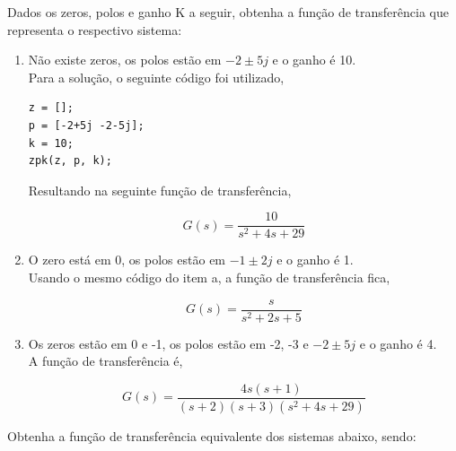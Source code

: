 \documentclass[a4paper, 10pt]{article}
\begin{document}
\begin{list}{\textbf{Questão .}}{
\setlength{\labelwidth}{-2mm} \setlength{\parsep}{0mm}
\setlength{\topsep}{0mm} \setlength{\leftmargin}{0mm}}
\newpage

         \item
             Dados os zeros, polos e ganho K a seguir, obtenha 
             a função de transferência que representa o respectivo sistema:
        \begin{enumerate}
            \item

                Não existe zeros, os polos estão em $-2\pm5j$ e o ganho é 10.\\
                
                Para a solução, o seguinte código foi utilizado,

                \begin{lstlisting}
z = [];
p = [-2+5j -2-5j];
k = 10;
zpk(z, p, k);               
                \end{lstlisting}

                Resultando na seguinte função de transferência,

                $$
                G(s) = \frac{10}{s^2 + 4 s + 29}
                $$



             \item
                 O zero está em 0, os polos estão em $-1\pm2j$ e o ganho é 1.\\

                 Usando o mesmo código do item a, a função de transferência fica,

                 $$
                 G(s) = \frac{s}{s^2 + 2 s + 5}
                 $$

                 

             \item
                 Os zeros estão em 0 e -1, os polos estão em -2, -3 e 
                 $-2\pm5j$ e o ganho é 4.\\

                 A função de transferência é,

                 $$
                 G(s) = \frac{4 s (s+1)}{(s+2) (s+3) (s^2 + 4 s + 29)}
                 $$
                

        \end{enumerate}



\newpage
\item
    Obtenha a função de transferência equivalente dos sistemas abaixo, sendo:


\end{list}
\end{document}
